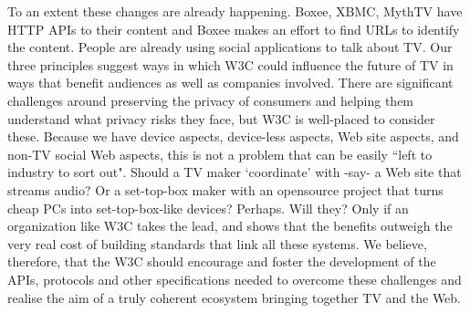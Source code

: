 \documentclass[]{article}%
\begin{document}
To an extent these changes are already happening. Boxee, XBMC, MythTV have HTTP APIs to their content and Boxee makes an effort to find URLs to identify the content. People are already using social applications to talk about TV. Our three principles suggest ways in which W3C could influence the future of TV in ways that benefit audiences as well as companies involved. There are significant challenges around preserving the privacy of consumers and helping them understand what privacy risks they face, but W3C is well-placed to consider these.
Because we have device aspects, device-less aspects, Web site aspects, and non-TV social Web aspects, this is not a problem that can be easily ``left to industry to sort out". Should a TV maker `coordinate' with -say- a Web site that streams audio? Or a set-top-box maker with an opensource project that turns cheap PCs into set-top-box-like devices? Perhaps. Will they? Only if an organization like W3C takes the lead, and shows that the benefits outweigh the very real cost of building standards that link all these systems. 
We believe, therefore, that the W3C should encourage and foster the development of the APIs, protocols and other specifications needed to overcome these challenges and realise the aim of a truly coherent ecosystem bringing together TV and the Web. 
\end{document}

